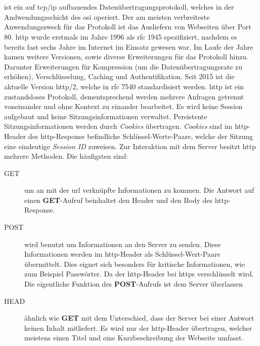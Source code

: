 \documentclass[titlepage]{report}
\begin{document}
\section*{}
 ist ein auf \gls{tcp}/\gls{ip} aufbauendes
Datenübertragungsprotokoll, welches in der Andwendungsschicht des
\gls{osi} operiert. Der am meisten verbreiteste Anwendungszweck für das
Protokoll ist das Ausliefern von Webseiten über Port 80. \gls{http}
wurde erstmals im Jahre 1996 als \gls{rfc} 1945 spezifiziert, nachdem 
es bereits fast sechs Jahre im Internet im Einsatz gewesen
war\cite{RFC1945}. Im Laufe der Jahre kamen weitere Versionen,
sowie diverse Erweiterungen für das Protokoll hinzu. Darunter
Erweiterungen für Kompression (um die Datenübertragungsrate zu erhöhen),
Verschlüsselung, Caching und Authentifikation. Seit 2015 ist die
aktuelle Version \gls{http}/2, welche in \gls{rfc} 7540 standardisiert
werden\cite{RFC7540}. \gls{http} ist ein zustandsloses Protokoll,
dementsprechend werden mehrere Anfragen getrennt voneinander und ohne
Kontext zu einander bearbeitet. Es wird keine Session aufgebaut und
keine Sitzungsinformationen verwaltet. Persistente Sitzungsinformationen 
werden durch \emph{Cookies} übertragen. \emph{Cookies} sind im
\gls{http}\hyp{}Header des \gls{http}\hyp{}Response befindliche
Schlüssel\hyp{}Werte\hyp{}Paare,
welche der Sitzung eine eindeutige \emph{Session ID}
zuweisen\cite{RFC2965}\cite{RFC6265}\cite{RFC2109}.
Zur Interaktion mit dem Server besitzt \gls{http} mehrere Methoden. Die häufigsten sind:
\begin{description}
    \item[GET] um an mit der \gls{url} verknüpfte Informationen zu
        kommen. Die Antwort auf einen \textbf{GET}\hyp{}Aufruf
        beinhaltet den Header und den Body des
        \gls{http}\hyp{}Response\cite[Siehe Section 9.3]{RFC2616}.
    \item[POST] wird benutzt um Informationen an den Server zu senden.
        Diese Informationen werden im \gls{http}\hyp{}Header als
        Schlüssel\hyp{}Wert\hyp{}Paare übermittelt\cite[Siehe Section
        9.5]{RFC2616}. Dies eignet sich besonders für kritische Informationen, wie zum Beispiel
        Passwörter. Da der \gls{http}\hyp{}Header bei \gls{https}
        verschlüsselt wird. Die eigentliche Funktion des
        \textbf{POST}\hyp{}Aufrufs ist dem Server überlassen\cite[Siehe
        Section 9.3]{RFC2616}
    \item[HEAD] ähnlich wie \textbf{GET} mit dem Unterschied, dass
        der Server bei einer Antwort keinen Inhalt mitliefert. Es wird
        nur der \gls{http}\hyp{}Header übertragen\cite[Siehe Section
        9.4]{RFC2616}, welcher meistens
        einen Titel und eine Kurzbeschreibung der Webseite umfasst.
\end{description}
\end{document}
